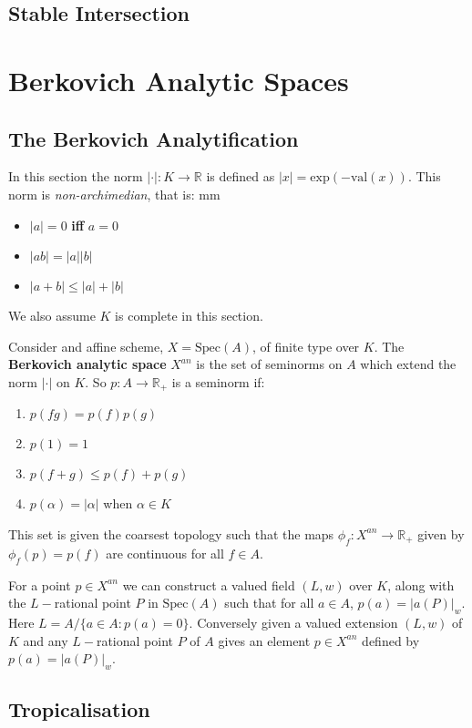 \subsection{Stable Intersection}

\section{Berkovich Analytic Spaces}
\subsection{The Berkovich Analytification}
    In this section the norm $|\cdot |:K \to \mathbb{R}$ is defined as $|x| = \text{exp}(-\text{val}(x))$. This norm is \textit{non-archimedian}, that is: 
mm
    \begin{itemize}
        \item $|a| = 0$ \textbf{iff} $a=0$
        \item $|ab| = |a||b|$
        \item $|a+b| \leq |a|+|b|$
    \end{itemize}
    We also assume $K$ is complete in this section.
    \begin{definition}
        Consider and affine scheme, $X = \text{Spec}(A)$, of finite type over $K$. 
        The \textbf{Berkovich analytic space} $X^{an}$ is the set of seminorms on $A$ which extend the norm $|\cdot|$ on $K$. 
        So $p:A \to \mathbb{R}_{+}$ is a seminorm if:
        \begin{enumerate}
            \item $p(fg) = p(f)p(g)$
            \item $p(1)=1$
            \item $p(f+g)\leq p(f)+p(g)$
            \item $p(\alpha) = |\alpha|$ when $\alpha \in K$
        \end{enumerate}
        This set is given the coarsest topology such that the maps $\phi_f:X^{an}\to \mathbb{R}_{+}$ given by $\phi_f(p) = p(f)$ are continuous for all $f \in A$.
    \end{definition}
    For a point $p \in X^{an}$ we can construct a valued field $(L,w)$ over $K$, along with the $L-$rational point $P$ in $\text{Spec}(A)$ such that for all $a \in A$, $p(a) = |a(P)|_{w}$. 
    Here $L = A/\{a \in A: p(a)=0\}$. 
    Conversely given a valued extension $(L,w)$ of $K$ and any $L-$rational point $P$ of $A$ gives an element $p \in X^{an}$ defined by $p(a) = |a(P)|_{w}$.
\subsection{Tropicalisation}

